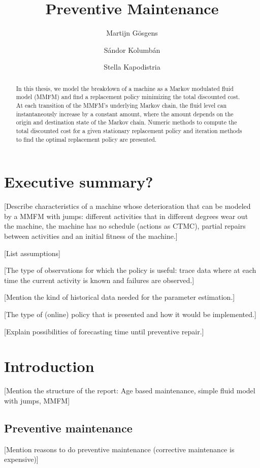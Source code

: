 

\title{Preventive Maintenance}
\author{Martijn G\"{o}sgens\\
\and
S\'{a}ndor Kolumb\'{a}n\\
\and
Stella Kapodistria
}



\begin{abstract}
	In this thesis, we model the breakdown of a machine as a Markov modulated fluid model (MMFM) and find a replacement policy minimizing the total discounted cost.
	At each transition of the MMFM's underlying Markov chain, the fluid level can instantaneously increase by a constant amount, where the amount depends on the origin and destination state of the Markov chain.
	Numeric methods to compute the total discounted cost for a given stationary replacement policy and iteration methods to find the optimal replacement policy are presented.
\end{abstract}

\chapter*{Executive summary?}
[Describe characteristics of a machine whose deterioration that can be modeled by a MMFM with jumps: different activities that in different degrees wear out the machine, the machine has no schedule (actions as CTMC), partial repairs between activities and an initial fitness of the machine.]

[List assumptions]

[The type of observations for which the policy is useful: trace data where at each time the current activity is known and failures are observed.]

[Mention the kind of historical data needed for the parameter estimation.]

[The type of (online) policy that is presented and how it would be implemented.]

[Explain possibilities of forecasting time until preventive repair.]

\tableofcontents


\chapter{Introduction}
[Mention the structure of the report: Age based maintenance, simple fluid model with jumps, MMFM]
\section{Preventive maintenance}
[Mention reasons to do preventive maintenance (corrective maintenance is expensive)]
